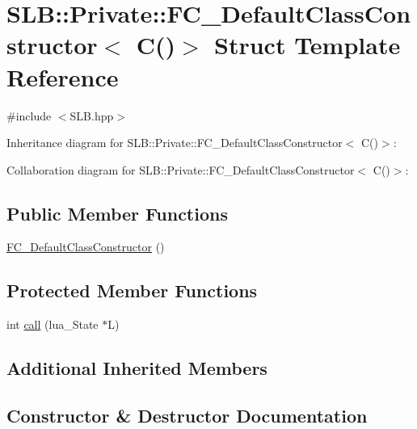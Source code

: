 \hypertarget{structSLB_1_1Private_1_1FC__DefaultClassConstructor_3_01C_07_08_4}{}\section{S\+LB\+:\+:Private\+:\+:F\+C\+\_\+\+Default\+Class\+Constructor$<$ C()$>$ Struct Template Reference}
\label{structSLB_1_1Private_1_1FC__DefaultClassConstructor_3_01C_07_08_4}


{\ttfamily \#include $<$S\+L\+B.\+hpp$>$}



Inheritance diagram for S\+LB\+:\+:Private\+:\+:F\+C\+\_\+\+Default\+Class\+Constructor$<$ C()$>$\+:


Collaboration diagram for S\+LB\+:\+:Private\+:\+:F\+C\+\_\+\+Default\+Class\+Constructor$<$ C()$>$\+:
\subsection*{Public Member Functions}
\begin{DoxyCompactItemize}
\item 
\hyperlink{structSLB_1_1Private_1_1FC__DefaultClassConstructor_3_01C_07_08_4_a138b6f91ee096157ecaa998bc475242d}{F\+C\+\_\+\+Default\+Class\+Constructor} ()
\end{DoxyCompactItemize}
\subsection*{Protected Member Functions}
\begin{DoxyCompactItemize}
\item 
int \hyperlink{structSLB_1_1Private_1_1FC__DefaultClassConstructor_3_01C_07_08_4_af0351f7618de41b36d9c1ebe60e8cee8}{call} (lua\+\_\+\+State $\ast$L)
\end{DoxyCompactItemize}
\subsection*{Additional Inherited Members}


\subsection{Constructor \& Destructor Documentation}
